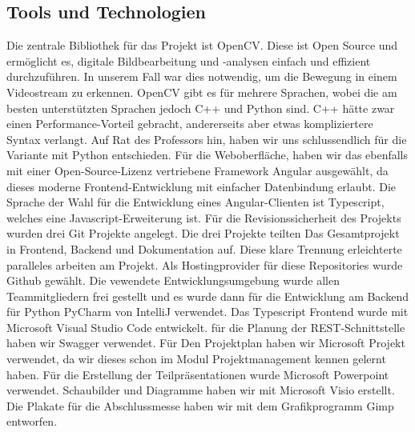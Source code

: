 \subsection{Tools und Technologien}
Die zentrale Bibliothek für das Projekt ist OpenCV. Diese ist Open Source und ermöglicht es, digitale Bildbearbeitung und -analysen einfach und effizient durchzuführen. In unserem Fall war dies notwendig, um die Bewegung in einem Videostream zu erkennen. \newline
OpenCV gibt es für mehrere Sprachen, wobei die am besten unterstützten Sprachen jedoch C++ und Python sind. C++ hätte zwar einen Performance-Vorteil gebracht, andererseits aber etwas kompliziertere Syntax verlangt. Auf Rat des Professors hin, haben wir uns schlussendlich für die Variante mit Python entschieden. \newline
Für die Weboberfläche, haben wir das ebenfalls mit einer Open-Source-Lizenz vertriebene Framework Angular ausgewählt, da dieses moderne Frontend-Entwicklung mit einfacher Datenbindung erlaubt.\newline
Die Sprache der Wahl für die Entwicklung eines Angular-Clienten ist Typescript, welches eine Javascript-Erweiterung ist.\newline
Für die Revisionssicherheit des Projekts wurden drei Git Projekte angelegt.
Die drei Projekte teilten Das Gesamtprojekt in Frontend, Backend und Dokumentation auf. Diese klare Trennung erleichterte paralleles arbeiten am Projekt. Als Hostingprovider für diese Repositories wurde Github gewählt.\newline
Die vewendete Entwicklungsumgebung wurde allen Teammitgliedern frei gestellt und es wurde dann für die Entwicklung am Backend für Python PyCharm von IntelliJ verwendet. Das Typescript Frontend wurde mit Microsoft Visual Studio Code entwickelt.\newline
für die Planung der REST-Schnittstelle haben wir Swagger verwendet.\newline
Für Den Projektplan haben wir Microsoft Projekt verwendet, da wir dieses schon im  Modul Projektmanagement kennen gelernt haben.\newline
Für die Erstellung der Teilpräsentationen wurde Microsoft Powerpoint verwendet.\newline
Schaubilder und Diagramme haben wir mit Microsoft Visio erstellt.\newline
Die Plakate für die Abschlussmesse haben wir mit dem Grafikprogramm Gimp entworfen.\newline

